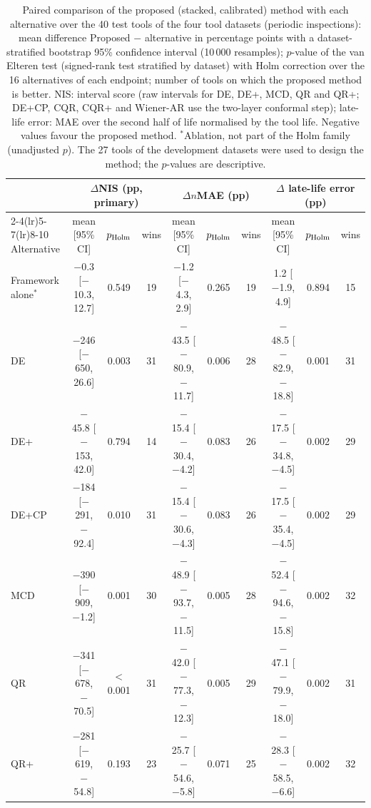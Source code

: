 \begin{table}[!tbp]
\centering
\caption{Paired comparison of the proposed (stacked, calibrated) method with each alternative over the 40 test tools of the four tool datasets (periodic inspections): mean difference Proposed $-$ alternative in percentage points with a dataset-stratified bootstrap 95\% confidence interval (10\,000 resamples); $p$-value of the van Elteren test (signed-rank test stratified by dataset) with Holm correction over the 16 alternatives of each endpoint; number of tools on which the proposed method is better. NIS: interval score (raw intervals for DE, DE+, MCD, QR and QR+; DE+CP, CQR, CQR+ and Wiener-AR use the two-layer conformal step); late-life error: MAE over the second half of life normalised by the tool life. Negative values favour the proposed method. $^\ast$Ablation, not part of the Holm family (unadjusted $p$). The 27 tools of the development datasets were used to design the method; the $p$-values are descriptive.}
\label{tab:signif}
\scriptsize\setlength{\tabcolsep}{2.6pt}
\begin{tabular}{lccccccccc}
\toprule
 & \multicolumn{3}{c}{$\Delta$NIS (pp, primary)} & \multicolumn{3}{c}{$\Delta n$MAE (pp)} & \multicolumn{3}{c}{$\Delta$ late-life error (pp)}\\
\cmidrule(lr){2-4}\cmidrule(lr){5-7}\cmidrule(lr){8-10}
Alternative & mean [95\% CI] & $p_{\rm Holm}$ & wins & mean [95\% CI] & $p_{\rm Holm}$ & wins & mean [95\% CI] & $p_{\rm Holm}$ & wins\\
\midrule
Framework alone$^\ast$ & $-$0.3 [$-$10.3, 12.7] & 0.549 & 19 & $-$1.2 [$-$4.3, 2.9] & 0.265 & 19 & 1.2 [$-$1.9, 4.9] & 0.894 & 15\\
\midrule
DE & $-$246 [$-$650, 26.6] & 0.003 & 31 & $-$43.5 [$-$80.9, $-$11.7] & 0.006 & 28 & $-$48.5 [$-$82.9, $-$18.8] & 0.001 & 31\\
DE+ & $-$45.8 [$-$153, 42.0] & 0.794 & 14 & $-$15.4 [$-$30.4, $-$4.2] & 0.083 & 26 & $-$17.5 [$-$34.8, $-$4.5] & 0.002 & 29\\
DE+CP & $-$184 [$-$291, $-$92.4] & 0.010 & 31 & $-$15.4 [$-$30.6, $-$4.3] & 0.083 & 26 & $-$17.5 [$-$35.4, $-$4.5] & 0.002 & 29\\
MCD & $-$390 [$-$909, $-$1.2] & 0.001 & 30 & $-$48.9 [$-$93.7, $-$11.5] & 0.005 & 28 & $-$52.4 [$-$94.6, $-$15.8] & 0.002 & 32\\
QR & $-$341 [$-$678, $-$70.5] & $<$0.001 & 31 & $-$42.0 [$-$77.3, $-$12.3] & 0.005 & 29 & $-$47.1 [$-$79.9, $-$18.0] & 0.002 & 31\\
QR+ & $-$281 [$-$619, $-$54.8] & 0.193 & 23 & $-$25.7 [$-$54.6, $-$5.8] & 0.071 & 25 & $-$28.3 [$-$58.5, $-$6.6] & 0.002 & 32\\

\end{tabular}
\end{table}

